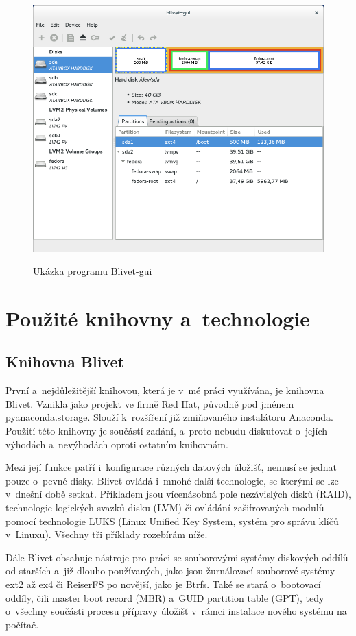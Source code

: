 \documentclass[color,table,oneside,nolot,nolof]{fithesis}
\begin{document}
 \begin{figure}[h]
	 \label{fig:blivet}
	 \caption{Ukázka programu Blivet-gui~\cite{blivet-gui}}
	 \centering
	 \includegraphics[width=.8\columnwidth]{pictures/blivet-gui-1.png}\\
 \end{figure}

\chapter{Použité knihovny a~technologie}
\section{Knihovna Blivet}
	První a~nejdůležitější knihovou, která je v~mé práci využívána, je knihovna Blivet. Vznikla jako projekt
	ve firmě Red Hat, původně pod jménem pyanaconda.storage\cite{blivet}. Slouží k~rozšíření již zmiňovaného instalátoru Anaconda. Použití této knihovny je součástí zadání, 
	a~proto nebudu diskutovat o~jejích výhodách a~nevýhodách oproti ostatním knihovnám. 

	Mezi její funkce patří i~konfigurace různých datových úložišť, nemusí se jednat pouze o~pevné disky.
	Blivet ovládá i~mnohé další technologie, se kterými se lze v~dnešní době setkat. Příkladem jsou vícenásobná pole nezávislých disků (RAID), technologie logických svazků disku (LVM) či 
	ovládání zašifrovaných modulů pomocí technologie LUKS (Linux Unified Key System, systém pro správu klíčů v~Linuxu). Všechny tři příklady rozebírám níže.

	Dále Blivet obsahuje nástroje pro práci se souborovými systémy diskových oddílů od starších a~již dlouho používaných, jako jsou žurnálovací souborové systémy ext2 až ex4 či ReiserFS\cite{journalFS}  po novější, jako je Btrfs. Také se stará o~bootovací oddíly, čili master boot record (MBR) a~GUID partition table (GPT), tedy o~všechny součásti procesu přípravy úložišť v~rámci instalace nového systému na počítač.
\end{document}

